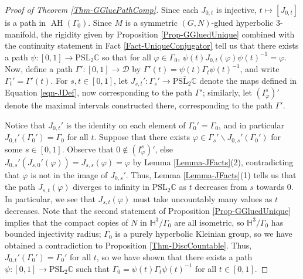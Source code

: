 \documentclass[11pt,leqno]{article}
\DeclareMathOperator{\AH}{AH}
\theoremstyle{introdef}
\numberwithin{lemma}{section}
\theoremstyle{definition}
\newcommand{\C}{\mathbb{C}}
\begin{document}
\begin{proof}[Proof of Theorem \ref{Thm-GGluePathComp}]
     Since each $J_{0,t}$ is injective, $t\mapsto[J_{0,t}]$ is a path in $\AH(\Gamma_0)$. Since $M$ is a symmetric $(G,N)$-glued hyperbolic $3$-manifold, the rigidity given by Proposition \ref{Prop-GGluedUnique} combined with the continuity statement in Fact \ref{Fact-UniqueConjugator} tell us that there exists a path $\psi:[0,1]\rightarrow\mathrm{PSL}_2\C$ so that for all $\varphi\in\Gamma_0$, $\psi(t) J_{0,t}(\varphi)\psi(t)^{-1}=\varphi$. Now, define a path $\Gamma':[0,1]\rightarrow\mathcal{D}$ by $\Gamma'(t)=\psi(t)\Gamma_t\psi(t)^{-1}$, and write $\Gamma_t'=\Gamma'(t)$. For $s,t\in[0,1]$, let $J_{s,t}':\Gamma_s'\rightarrow\overline{\mathrm{PSL}_2\C}$ denote the maps defined in Equation \ref{eqn-JDef}, now corresponding to the path $\Gamma'$; similarly, let $(I_\varphi^{s})'$ denote the maximal intervals constructed there, corresponding to the path $\Gamma'$.\par

     Notice that $J_{0,t}'$ is the identity on each element of $\Gamma_0'=\Gamma_0$, and in particular $J_{0,t}'(\Gamma_0')=\Gamma_0$ for all $t$. Suppose that there exists $\varphi\in\Gamma_s'\backslash J_{0,s}'(\Gamma_0')$ for some $s\in[0,1]$. Observe that $0\not\in (I_\varphi^{s})'$, else $J_{0,s}'(J_{s,0}'(\varphi))=J_{s,s}(\varphi)=\varphi$ by Lemma \ref{Lemma-JFacts}(2), contradicting that $\varphi$ is not in the image of $J_{0,s}'$. Thus, Lemma \ref{Lemma-JFacts}(1) tells us that the path $J_{s,t}(\varphi)$ diverges to infinity in $\mathrm{PSL}_2\C$ as $t$ decreases from $s$ towards $0$. In particular, we see that $J_{s,t}(\varphi)$ must take uncountably many values as $t$ decreases. Note that the second statement of Proposition \ref{Prop-GGluedUnique} implies that the compact copies of $N$ in $\mathbb{H}^3/\Gamma_0$ are all isometric, so $\mathbb{H}^3/\Gamma_0$ has bounded injectivity radius; $\Gamma_0$ is a purely hyperbolic Kleinian group, so we have obtained a contradiction to Proposition \ref{Thm-DiscCountable}. Thus, $J_{0,t}'(\Gamma_0')=\Gamma_0'$ for all $t$, so we have shown that there exists a path $\psi:[0,1]\rightarrow\mathrm{PSL}_2\C$ such that $\Gamma_0=\psi(t)\Gamma_t\psi(t)^{-1}$ for all $t\in[0,1]$.\par


\end{proof}
\end{document}
